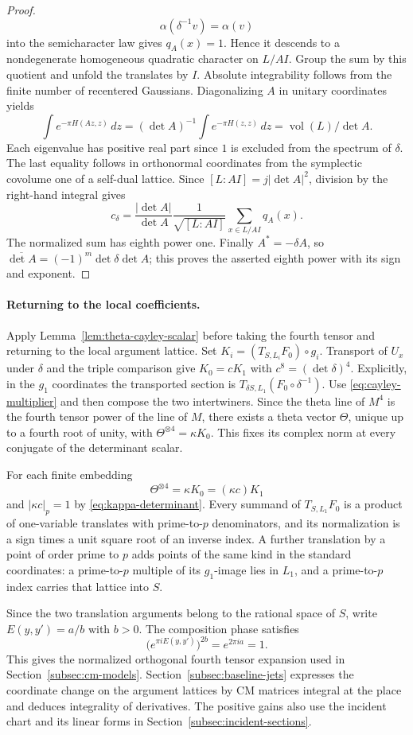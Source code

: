 \begin{proof}
\[
  \alpha(\delta^{-1}v)=\alpha(v)
\]
 into the semicharacter
law gives \(q_A(x)=1\). Hence it descends to a
nondegenerate homogeneous quadratic character on \(L/AI\).
Group the sum by this quotient and unfold the translates by
\(I\). Absolute integrability follows from the finite number
of recentered Gaussians. Diagonalizing \(A\) in unitary
coordinates yields
\[
 \int e^{-\pi H(Az,z)}\,dz=
      (\det A)^{-1}\int e^{-\pi H(z,z)}\,dz
       =\operatorname{vol}(L)/\det A .
\]
Each eigenvalue has positive real part since \(1\) is excluded
from the spectrum of \(\delta\). The last equality follows in
orthonormal coordinates from the symplectic covolume one of a
self-dual lattice. Since \([L:AI]=j|\det A|^2\), division by
the right-hand integral gives
\[
  c_\delta=\frac{|\det A|}{\det A}
      \frac{1}{\sqrt{[L:AI]}}\sum_{x\in L/AI}q_A(x).
\]
The normalized sum has eighth power one.
Finally \(A^*=-\delta A\), so
\(\overline{\det A}=(-1)^m\det\delta\det A\);
this proves the asserted eighth power with its sign and exponent.
\end{proof}

\paragraph{Returning to the local coefficients.}
Apply Lemma~\ref{lem:theta-cayley-scalar} before taking the
fourth tensor and returning to the local argument lattice.
Set \(K_i=(T_{S,L_i}F_0)\circ g_i\). Transport of \(U_x\)
under \(\delta\) and the triple comparison give
\(K_0=cK_1\) with \(c^8=(\det\delta)^4\). Explicitly, in
the \(g_1\) coordinates the transported section is
\(T_{\delta S,L_1}(F_0\circ\delta^{-1})\).
Use \eqref{eq:cayley-multiplier} and then compose the two
intertwiners. Since the theta line of \(M^4\) is the fourth
tensor power of the line of \(M\), there exists a theta
vector \(\Theta\), unique up to a fourth root of unity,
with \(\Theta^{\otimes4}=\kappa K_0\). This fixes its
complex norm at every conjugate of the determinant scalar.

For each finite embedding 
\[
  \Theta^{\otimes4}=\kappa K_0=(\kappa c)K_1
\]
and \(|\kappa c|_p=1\) by \eqref{eq:kappa-determinant}.
Every summand of \(T_{S,L_1}F_0\) is a product of
one-variable translates with prime-to-\(p\) denominators,
and its normalization is a sign times a unit square root
of an inverse index. A further translation by a point of
order prime to \(p\) adds points of the same kind in the
standard coordinates: a prime-to-\(p\) multiple of its
\(g_1\)-image lies in \(L_1\), and a prime-to-\(p\) index
carries that lattice into \(S\).

Since the two translation arguments belong to the rational space of \(S\), write \(E(y,y')=a/b\) with \(b>0\). The composition phase satisfies
\[
  \bigl(e^{\pi iE(y,y')}\bigr)^{2b}=e^{2\pi ia}=1.
\]
This gives the normalized orthogonal fourth tensor expansion
used in Section~\ref{subsec:cm-models}. Section~\ref{subsec:baseline-jets} expresses the
coordinate change on the argument lattices by CM matrices
integral at the place and deduces integrality of derivatives.
The positive gains also use the incident chart and its
linear forms in Section~\ref{subsec:incident-sections}.
